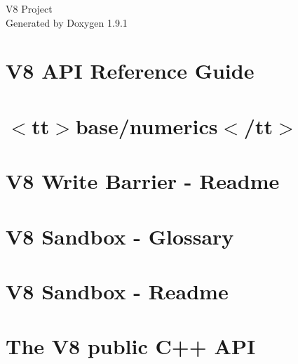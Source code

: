 \let\mypdfximage\pdfximage\def\pdfximage{\immediate\mypdfximage}\documentclass[twoside]{book}
\newcommand{\+}{\discretionary{\mbox{\scriptsize$\hookleftarrow$}}{}{}}
\newcommand{\clearemptydoublepage}{%
  \newpage{\pagestyle{empty}\cleardoublepage}%
}
\begin{document}
\raggedbottom

\hypersetup{pageanchor=false,
             bookmarksnumbered=true,
             pdfencoding=unicode
            }
\begin{titlepage}
\vspace*{7cm}
\begin{center}%
{\Large V8 Project }\\
\vspace*{1cm}
{\large Generated by Doxygen 1.9.1}\\
\end{center}
\end{titlepage}
\clearemptydoublepage
{}
\tableofcontents
\clearemptydoublepage
{}
\hypersetup{pageanchor=true}

\chapter{V8 API Reference Guide}
\label{index}\hypertarget{index}{}
\chapter{$<$tt$>$base/numerics$<$/tt$>$}
\label{md__tmp_V8SourceCode_src_base_numerics_README}

\chapter{V8 Write Barrier -\/ Readme}
\label{md__tmp_V8SourceCode_src_heap_WRITE_BARRIER}

\chapter{V8 Sandbox -\/ Glossary}
\label{md__tmp_V8SourceCode_src_sandbox_GLOSSARY}

\chapter{V8 Sandbox -\/ Readme}
\label{md__tmp_V8SourceCode_src_sandbox_README}

\chapter{The V8 public C++ API}
\label{md__tmp_V8SourceCode_include_APIDesign}

\end{document}
